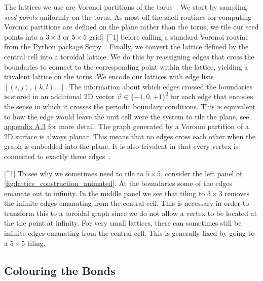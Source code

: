The lattices we use are Voronoi partitions of the torus~\autocite{mitchellAmorphousTopologicalInsulators2018,marsalTopologicalWeaireThorpeModels2020,florescu_designer_2009}. We start by sampling \emph{seed points} uniformly on the torus. As most off the shelf routines for computing Voronoi partitions are defined on the plane rather than the torus, we tile our seed points into a \(3\times3\) or \(5\times5\) grid{]}~{[}\^{}1{]} before calling a standard Voronoi routine~\autocite{barberQuickhullAlgorithmConvex1996} from the Python package Scipy~\autocite{virtanenSciPyFundamentalAlgorithms2020}. Finally, we convert the lattice defined by the central cell into a toroidal lattice. We do this by reassigning edges that cross the boundaries to connect to the corresponding point within the lattice, yielding a trivalent lattice on the torus. We encode our lattices with edge lists \([(i,j), (k,l)\ldots]\). The information about which edges crossed the boundaries is stored in an additional 2D vector \(\vec{v} \in \{-1,0,+1\}^2\) for each edge that encodes the sense in which it crosses the periodic boundary conditions. This is equivalent to how the edge would leave the unit cell were the system to tile the plane, see \protect\hyperlink{app-lattice-generation}{appendix A.3} for more detail. The graph generated by a Voronoi partition of a 2D surface is always planar. This means that no edges cross each other when the graph is embedded into the plane. It is also trivalent in that every vertex is connected to exactly three edges~\autocite{voronoiNouvellesApplicationsParamètres1908,watsonComputingNdimensionalDelaunay1981}.

{[}\^{}1{]} To see why we sometimes need to tile to \(5\times 5\), consider the left panel of \cref{fig:lattice_construction_animated}. At the boundaries some of the edges emanate out to infinity. In the middle panel we see that tiling to \(3\times 3\) removes the infinite edges emanating from the central cell. This is necessary in order to transform this to a toroidal graph since we do not allow a vertex to be located at the the point at infinity. For very small lattices, there can sometimes still be infinite edges emanating from the central cell. This is generally fixed by going to a \(5\times 5\) tiling.

\hypertarget{colouring-the-bonds}{%
\subsection{Colouring the Bonds}\label{colouring-the-bonds}}

